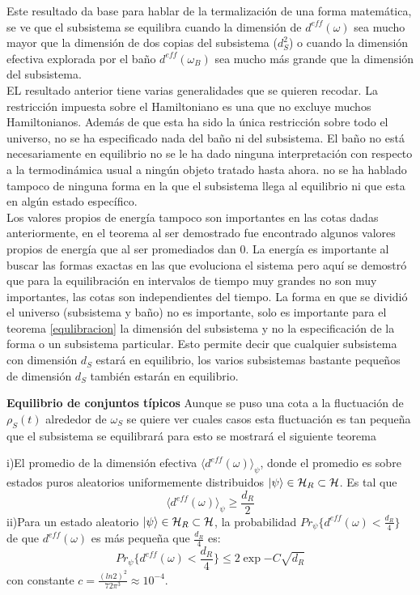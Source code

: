 Este resultado  da base para hablar de la termalización de una forma matemática, se ve que el subsistema se equilibra cuando la dimensión de $d^{eff}(\omega)$ sea mucho mayor que la dimensión de dos copias del subsistema ($d_{S}^{2}$) o cuando la dimensión efectiva explorada por el baño $d^{eff}(\omega_{B})$ sea mucho más grande que la dimensión del subsistema.
\\
EL resultado anterior tiene varias generalidades que se quieren recodar. La restricción impuesta sobre el Hamiltoniano  es una que no excluye muchos Hamiltonianos. Además de que esta ha sido la única restricción sobre todo el universo, no se ha especificado nada del baño ni del subsistema. El baño no está necesariamente en equilibrio no se le ha dado ninguna interpretación con respecto a la termodinámica usual a ningún objeto tratado hasta ahora. no se ha hablado tampoco de ninguna forma en la que el subsistema llega al equilibrio ni que esta en algún estado específico.
\\
Los valores propios de energía tampoco son importantes en las cotas dadas anteriormente, en el teorema al ser demostrado fue encontrado algunos valores propios de energía que al ser promediados dan 0. La energía es importante al buscar las formas exactas en las que evoluciona el sistema pero aquí se demostró que para la equilibración en intervalos de tiempo muy grandes no son muy importantes, las cotas son independientes del tiempo. La forma en que se dividió el universo (subsistema y baño) no es importante, solo es importante para el teorema \ref{equlibracion} la dimensión del subsistema y no la especificación de la forma o un subsistema particular. Esto permite decir que cualquier subsistema con dimensión $d_{S}$ estará en equilibrio, los varios subsistemas bastante pequeños de dimensión $d_{S}$ también estarán en equilibrio.

\textbf{Equilibrio de conjuntos típicos}
Aunque se puso una cota a la fluctuación de $\rho_{S}(t)$ alrededor de $\omega_{S}$ se quiere ver cuales casos esta fluctuación es tan pequeña que el subsistema se equilibrará para esto se mostrará el siguiente teorema\\

\begin{theorem}
i)El promedio de la dimensión efectiva $\langle d^{eff}(\omega) \rangle_{\psi}$, donde el promedio es sobre estados puros aleatorios uniformemente distribuidos $\ket{\psi} \in \mathcal{H}_{R} \subset \mathcal{H}$. Es tal que 
\begin{equation}
\langle d^{eff}(\omega) \rangle_{\psi} \ge \frac{d_{R}}{2}
\end{equation}
ii)Para un estado aleatorio $\ket{\psi} \in \mathcal{H}_{R} \subset \mathcal{H}$, la probabilidad $Pr_{\psi} \{ d^{eff}(\omega) < \frac{d_{R}}{4}  \}$ de que $d^{eff}(\omega)$ es más pequeña que $\frac{d_{R}}{4}$ es:
\begin{equation}
Pr_{\psi} \{ d^{eff}(\omega) < \frac{d_{R}}{4}  \} \leq 2 \exp{-C \sqrt{d_{R}}}
\end{equation}
con constante $c= \frac{(ln 2)^{2}}{72 \pi^{3}} \approx 10^{-4}$.
\end{theorem}

